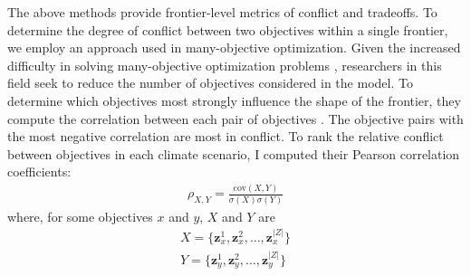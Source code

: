 The above methods provide frontier-level metrics of conflict and tradeoffs. To determine the degree of conflict between two objectives within a single frontier, we employ an approach used in many-objective optimization. Given the increased difficulty in solving many-objective optimization problems \cite{khare2003performance}, researchers in this field seek to reduce the number of objectives considered in the model. To determine which objectives most strongly influence the shape of the frontier, they compute the correlation between each pair of objectives \cite{deb2005finding}. The objective pairs with the most negative correlation are most in conflict. To rank the relative conflict between objectives in each climate scenario, I computed their Pearson correlation coefficients:
\begin{align}
\rho_{X,Y} = \frac{\text{cov}(X,Y)}{\sigma(X)\sigma(Y)}
\end{align}
where, for some objectives $x$ and $y$, $X$ and $Y$ are
\begin{align}
X = \{ \mathbf{z}_x^1, \mathbf{z}_x^2, \ldots, \mathbf{z}_x^{|Z|} \} \\
Y = \{ \mathbf{z}_y^1, \mathbf{z}_y^2, \ldots, \mathbf{z}_y^{|Z|} \} \\
\end{align}